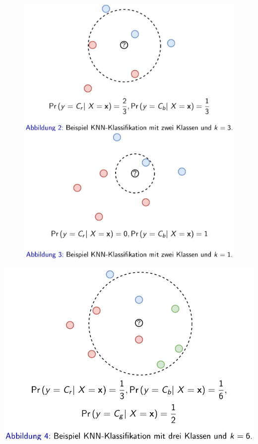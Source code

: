 \documentclass{report}
\begin{document}
  \begin{figure}[H]	
    \centering	
    \begin{minipage}[b]{0.4\textwidth}	
      \includegraphics[scale=.275]{ml05_2}	
    \end{minipage}	
    \hfill	
    \begin{minipage}[b]{0.4\textwidth}	
      \includegraphics[scale=.275]{ml05_3}	
    \end{minipage}	
  \end{figure}	
  
  \begin{center}	
    \includegraphics[scale=.275]{ml05_4}	
  \end{center}	
  
\end{document}
